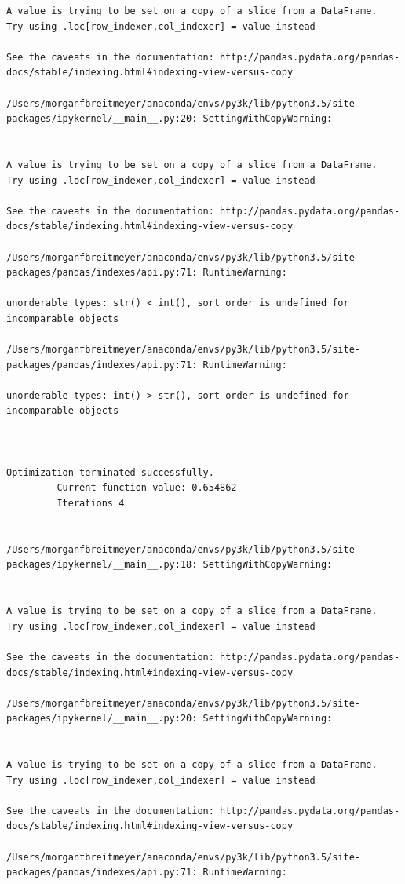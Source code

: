 \begin{lstlisting}
A value is trying to be set on a copy of a slice from a DataFrame.
Try using .loc[row_indexer,col_indexer] = value instead

See the caveats in the documentation: http://pandas.pydata.org/pandas-docs/stable/indexing.html#indexing-view-versus-copy

/Users/morganfbreitmeyer/anaconda/envs/py3k/lib/python3.5/site-packages/ipykernel/__main__.py:20: SettingWithCopyWarning:


A value is trying to be set on a copy of a slice from a DataFrame.
Try using .loc[row_indexer,col_indexer] = value instead

See the caveats in the documentation: http://pandas.pydata.org/pandas-docs/stable/indexing.html#indexing-view-versus-copy

/Users/morganfbreitmeyer/anaconda/envs/py3k/lib/python3.5/site-packages/pandas/indexes/api.py:71: RuntimeWarning:

unorderable types: str() < int(), sort order is undefined for incomparable objects

/Users/morganfbreitmeyer/anaconda/envs/py3k/lib/python3.5/site-packages/pandas/indexes/api.py:71: RuntimeWarning:

unorderable types: int() > str(), sort order is undefined for incomparable objects



Optimization terminated successfully.
         Current function value: 0.654862
         Iterations 4


/Users/morganfbreitmeyer/anaconda/envs/py3k/lib/python3.5/site-packages/ipykernel/__main__.py:18: SettingWithCopyWarning:


A value is trying to be set on a copy of a slice from a DataFrame.
Try using .loc[row_indexer,col_indexer] = value instead

See the caveats in the documentation: http://pandas.pydata.org/pandas-docs/stable/indexing.html#indexing-view-versus-copy

/Users/morganfbreitmeyer/anaconda/envs/py3k/lib/python3.5/site-packages/ipykernel/__main__.py:20: SettingWithCopyWarning:


A value is trying to be set on a copy of a slice from a DataFrame.
Try using .loc[row_indexer,col_indexer] = value instead

See the caveats in the documentation: http://pandas.pydata.org/pandas-docs/stable/indexing.html#indexing-view-versus-copy

/Users/morganfbreitmeyer/anaconda/envs/py3k/lib/python3.5/site-packages/pandas/indexes/api.py:71: RuntimeWarning:


\end{lstlisting}
